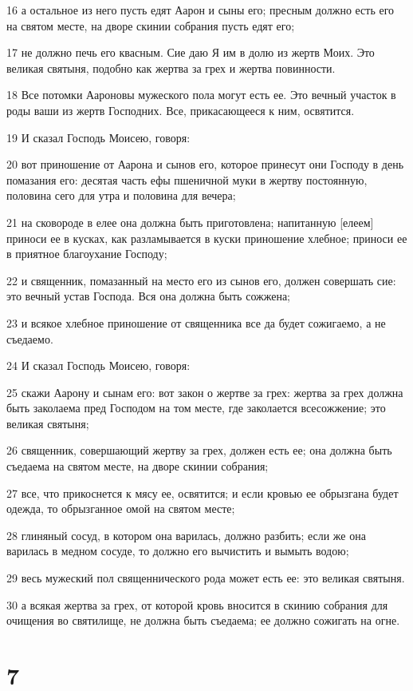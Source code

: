\par 16 а остальное из него пусть едят Аарон и сыны его; пресным должно есть его на святом месте, на дворе скинии собрания пусть едят его;
\par 17 не должно печь его квасным. Сие даю Я им в долю из жертв Моих. Это великая святыня, подобно как жертва за грех и жертва повинности.
\par 18 Все потомки Аароновы мужеского пола могут есть ее. Это вечный участок в роды ваши из жертв Господних. Все, прикасающееся к ним, освятится.
\par 19 И сказал Господь Моисею, говоря:
\par 20 вот приношение от Аарона и сынов его, которое принесут они Господу в день помазания его: десятая часть ефы пшеничной муки в жертву постоянную, половина сего для утра и половина для вечера;
\par 21 на сковороде в елее она должна быть приготовлена; напитанную [елеем] приноси ее в кусках, как разламывается в куски приношение хлебное; приноси ее в приятное благоухание Господу;
\par 22 и священник, помазанный на место его из сынов его, должен совершать сие: это вечный устав Господа. Вся она должна быть сожжена;
\par 23 и всякое хлебное приношение от священника все да будет сожигаемо, а не съедаемо.
\par 24 И сказал Господь Моисею, говоря:
\par 25 скажи Аарону и сынам его: вот закон о жертве за грех: жертва за грех должна быть заколаема пред Господом на том месте, где заколается всесожжение; это великая святыня;
\par 26 священник, совершающий жертву за грех, должен есть ее; она должна быть съедаема на святом месте, на дворе скинии собрания;
\par 27 все, что прикоснется к мясу ее, освятится; и если кровью ее обрызгана будет одежда, то обрызганное омой на святом месте;
\par 28 глиняный сосуд, в котором она варилась, должно разбить; если же она варилась в медном сосуде, то должно его вычистить и вымыть водою;
\par 29 весь мужеский пол священнического рода может есть ее: это великая святыня.
\par 30 а всякая жертва за грех, от которой кровь вносится в скинию собрания для очищения во святилище, не должна быть съедаема; ее должно сожигать на огне.

\chapter{7}

